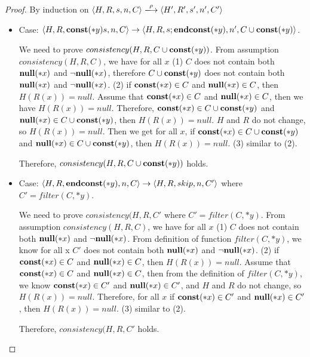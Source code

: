 \begin{proof}
  By induction on \(\langle H, R, s, n, C \rangle
  \xlongrightarrow{\rho} \langle H', R', s', n', C'\rangle \)
 \begin{itemize}
    
  \item Case: \(\langle H, R, \mathbf{const}(*y) s, n, C \rangle \rightarrow
    \langle H, R, s;\mathbf{endconst}(*y), n', C \cup {\mathbf{const}(*y)} \rangle \).

    We need to prove \(consistency(H, R, C \cup {\mathbf{const}(*y)})\). From
    assumption \(consistency(H, R, C)\), we have for all \(x\) (1)
    \(C\) does not contain both \({\bf null}(*x)\) and \(\neg{\bf null}(*x)\), therefore
    \(C \cup {\mathbf{const}(*y)}\) does not contain both \({\bf null}(*x)\) and
    \(\neg{\bf null}(*x)\). (2) if \(\mathbf{const}(*x) \in C\) and \({\bf null}(*x) \in C\),
    then \(H(R(x)) = null\). Assume that \(\mathbf{const}(*x) \in C\) and
    \({\bf null}(*x) \in C\), then we have \(H(R(x)) = null\). Therefore,
    \(\mathbf{const}(*x) \in C \cup {\mathbf{const}(*y)}\) and \({\bf null}(*x) \in C \cup
                 {\mathbf{const}(*y)}\), then \(H(R(x)) = null\). \(H\) and
                 \(R\) do not change, so \(H(R(x)) = null\). Then we
                 get for all \(x\), if \(\mathbf{const}(*x) \in C \cup
                 {\mathbf{const}(*y)}\) and \({\bf null}(*x) \in C \cup {\mathbf{const}(*y)}\),
                 then \(H(R(x)) = null\). (3) similar to (2).
                 
    Therefore, \(consistency(H, R, C \cup {\mathbf{const}(*y)})\) holds.

\item Case: \(\langle H, R, \mathbf{endconst}(*y), n, C \rangle \rightarrow
    \langle H, R, skip, n, C'\rangle \) where \(C' = filter(C, *y)\).

    We need to prove \(consistency(H, R, C'\) where \(C' = filter(C,
    *y)\). From assumption \(consistency(H, R, C)\), we have for all
    \(x\) (1) \(C\) does not contain both \({\bf null}(*x)\) and
    \(\neg{\bf null}(*x)\). From definition of function \(filter(C, *y)\), we
    know for all x \(C'\) does not contain both \({\bf null}(*x)\) and
    \(\neg{\bf null}(*x)\). (2) if \(\mathbf{const}(*x) \in C\) and \({\bf null}(*x) \in C\),
    then \(H(R(x)) = null\). Assume that \(\mathbf{const}(*x) \in C\) and
    \({\bf null}(*x) \in C\), then from the definition of \(filter(C, *y)\),
    we know \(\mathbf{const}(*x) \in C'\) and \({\bf null}(*x) \in C'\), and \(H\) and
    \(R\) do not change, so \(H(R(x)) = null\). Therefore, for all
    \(x\) if \(\mathbf{const}(*x) \in C'\) and \({\bf null}(*x) \in C'\), then
    \(H(R(x)) = null\). (3) similar to (2).
                 
    Therefore, \(consistency(H, R, C'\) holds.


\end{itemize}
\end{proof}
